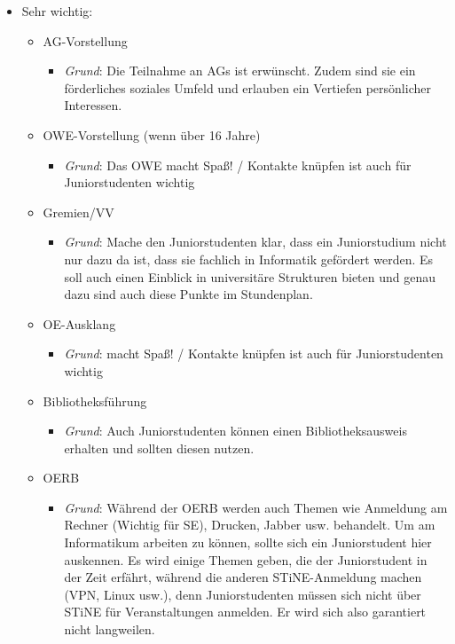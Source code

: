 \documentclass[a4paper,11pt]{scrartcl} %
\newenvironment{myitemize}{\begin{itemize}\itemsep -2pt}{\end{itemize}} %
\begin{document}
\begin{myitemize}
	\item Sehr wichtig:
		\begin{myitemize}
			\item AG-Vorstellung
				\begin{myitemize}
					\item \textit{Grund}: Die Teilnahme an AGs ist erwünscht. Zudem sind sie ein förderliches soziales Umfeld und erlauben ein Vertiefen persönlicher Interessen.
				\end{myitemize}
			\item OWE-Vorstellung (wenn über 16 Jahre)
				\begin{myitemize}
					\item \textit{Grund}: Das OWE macht Spaß! / Kontakte knüpfen ist auch für Juniorstudenten wichtig
				\end{myitemize}
			\item Gremien/VV
				\begin{myitemize}
					\item \textit{Grund}: Mache den Juniorstudenten klar, dass ein Juniorstudium nicht nur dazu da ist, dass sie fachlich in Informatik gefördert werden. Es soll auch einen Einblick in universitäre Strukturen bieten und genau dazu sind auch diese Punkte im Stundenplan.
				\end{myitemize}
			\item OE-Ausklang
				\begin{myitemize}
					\item \textit{Grund}: macht Spaß! / Kontakte knüpfen ist auch für Juniorstudenten wichtig
				\end{myitemize}
			\item Bibliotheksführung
				\begin{myitemize}
					\item \textit{Grund}: Auch Juniorstudenten können einen Bibliotheksausweis erhalten und sollten diesen nutzen.
				\end{myitemize}
			\item OERB
				\begin{myitemize}
					\item \textit{Grund}: Während der OERB werden auch Themen wie Anmeldung am Rechner (Wichtig für SE), Drucken, Jabber usw. behandelt. Um am Informatikum arbeiten zu können, sollte sich ein Juniorstudent hier auskennen. Es wird einige Themen geben, die der Juniorstudent in der Zeit erfährt, während die anderen STiNE-Anmeldung machen (VPN, Linux usw.), denn Juniorstudenten müssen sich nicht über STiNE für Veranstaltungen anmelden. Er wird sich also garantiert nicht langweilen.

\end{myitemize}
\end{myitemize}
\end{myitemize}
\end{document}
